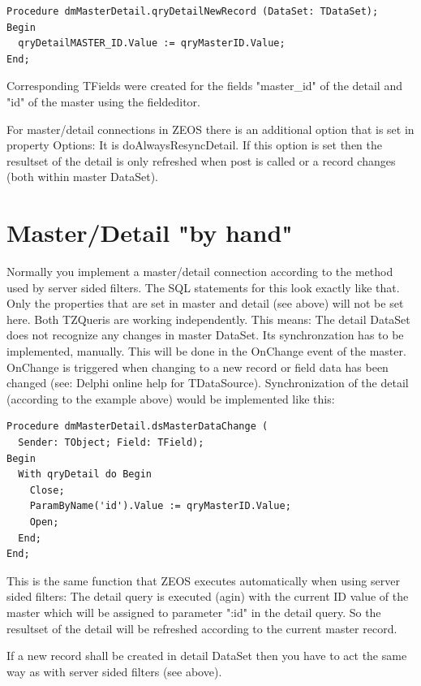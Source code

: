 \documentclass[a4paper,12pt,oneside]{book}
\begin{document}
\begin{verbatim}
Procedure dmMasterDetail.qryDetailNewRecord (DataSet: TDataSet);
Begin
  qryDetailMASTER_ID.Value := qryMasterID.Value;
End;
\end{verbatim}

Corresponding TFields were created for the fields "master\_id" of the detail and "id" of the master using the fieldeditor.

For master/detail connections in ZEOS there is an additional option that is set in property Options: It is doAlwaysResyncDetail.
If this option is set then the resultset of the detail is only refreshed when post is called or a record changes (both within master DataSet).

\section{Master/Detail "by hand"}
Normally you implement a master/detail connection according to the method used by server sided filters.
The SQL statements for this look exactly like that.
Only the properties that are set in master and detail (see above) will not be set here.
Both TZQueris are working independently.
This means: The detail DataSet does not recognize any changes in master DataSet.
Its synchronzation has to be implemented, manually.
This will be done in the OnChange event of the master.
OnChange is triggered when changing to a new record or field data has been changed (see: Delphi online help for TDataSource).
Synchronization of the detail (according to the example above) would be implemented like this:

\begin{verbatim}
Procedure dmMasterDetail.dsMasterDataChange (
  Sender: TObject; Field: TField);
Begin
  With qryDetail do Begin
    Close;
    ParamByName('id').Value := qryMasterID.Value;
    Open;
  End;
End;
\end{verbatim}

This is the same function that ZEOS executes automatically when using server sided filters:
The detail query is executed (agin) with the current ID value of the master which will be assigned to parameter ":id" in the detail query.
So the resultset of the detail will be refreshed according to the current master record.

If a new record shall be created in detail DataSet then you have to act the same way as with server sided filters (see above).
\end{document}
